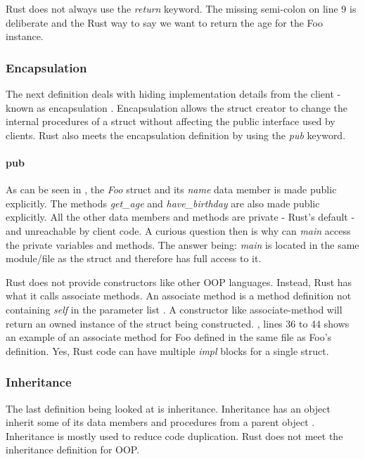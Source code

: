 \documentclass[a4paper,10pt]{article}
\begin{document}
\begin{notebox}
  Rust does not always use the \textit{return} keyword.
  The missing semi-colon on line 9 is deliberate and the Rust way to say we want to return the age for the Foo instance.
\end{notebox}

\subsubsection{Encapsulation}
The next definition deals with hiding implementation details from the client - known as encapsulation \cite{klabnik_2019_01, meyer_97_01}.
Encapsulation allows the struct creator to change the internal procedures of a struct without affecting the public interface used by clients.
Rust also meets the encapsulation definition by using the \textit{pub} keyword.

\paragraph{pub}
As can be seen in , the \textit{Foo} struct and its \textit{name} data member is made public explicitly.
The methods \textit{get\_age} and \textit{have\_birthday} are also made public explicitly.
All the other data members and methods are private - Rust's default - and unreachable by client code.
A curious question then is why can \textit{main} access the private variables and methods.
The answer being: \textit{main} is located in the same module/file as the struct and therefore has full access to it.

\begin{notebox}
  Rust does not provide constructors like other OOP languages.
  Instead, Rust has what it calls associate methods.
  An associate method is a method definition not containing \textit{self} in the parameter list \cite{klabnik_2019_01}.
  A constructor like associate-method will return an owned instance of the struct being constructed.
  , lines 36 to 44 shows an example of an associate method for Foo defined in the same file as Foo's definition.
  Yes, Rust code can have multiple \textit{impl} blocks for a single struct.
\end{notebox}

\subsubsection{Inheritance}
The last definition being looked at is inheritance.
Inheritance has an object inherit some of its data members and procedures from a parent object \cite{meyer_97_01, stefik_85_01, gamma_94_01}.
Inheritance is mostly used to reduce code duplication.
Rust does not meet the inheritance definition for OOP.
\end{document}
